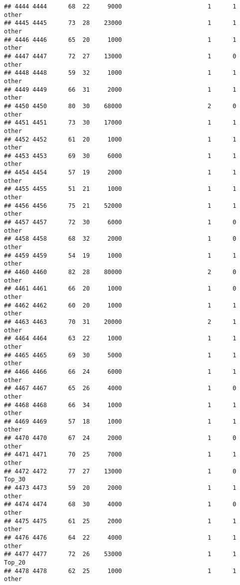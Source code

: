 \documentclass[
]{article}
\begin{document}
\begin{verbatim}
## 4444 4444      68  22     9000                        1      1    other
## 4445 4445      73  28    23000                        1      1    other
## 4446 4446      65  20     1000                        1      1    other
## 4447 4447      72  27    13000                        1      0    other
## 4448 4448      59  32     1000                        1      1    other
## 4449 4449      66  31     2000                        1      1    other
## 4450 4450      80  30    68000                        2      0    other
## 4451 4451      73  30    17000                        1      1    other
## 4452 4452      61  20     1000                        1      1    other
## 4453 4453      69  30     6000                        1      1    other
## 4454 4454      57  19     2000                        1      1    other
## 4455 4455      51  21     1000                        1      1    other
## 4456 4456      75  21    52000                        1      1    other
## 4457 4457      72  30     6000                        1      0    other
## 4458 4458      68  32     2000                        1      0    other
## 4459 4459      54  19     1000                        1      1    other
## 4460 4460      82  28    80000                        2      0    other
## 4461 4461      66  20     1000                        1      0    other
## 4462 4462      60  20     1000                        1      1    other
## 4463 4463      70  31    20000                        2      1    other
## 4464 4464      63  22     1000                        1      1    other
## 4465 4465      69  30     5000                        1      1    other
## 4466 4466      66  24     6000                        1      1    other
## 4467 4467      65  26     4000                        1      0    other
## 4468 4468      66  34     1000                        1      1    other
## 4469 4469      57  18     1000                        1      1    other
## 4470 4470      67  24     2000                        1      0    other
## 4471 4471      70  25     7000                        1      1    other
## 4472 4472      77  27    13000                        1      0   Top_30
## 4473 4473      59  20     2000                        1      1    other
## 4474 4474      68  30     4000                        1      0    other
## 4475 4475      61  25     2000                        1      1    other
## 4476 4476      64  22     4000                        1      1    other
## 4477 4477      72  26    53000                        1      1   Top_20
## 4478 4478      62  25     1000                        1      1    other

\end{verbatim}
\end{document}
